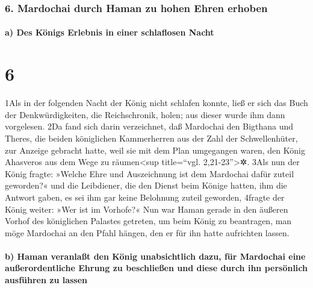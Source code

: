 \hypertarget{mardochai-durch-haman-zu-hohen-ehren-erhoben}{%
\subsubsection{6. Mardochai durch Haman zu hohen Ehren
erhoben}\label{mardochai-durch-haman-zu-hohen-ehren-erhoben}}

\hypertarget{a-des-kuxf6nigs-erlebnis-in-einer-schlaflosen-nacht}{%
\paragraph{a) Des Königs Erlebnis in einer schlaflosen
Nacht}\label{a-des-kuxf6nigs-erlebnis-in-einer-schlaflosen-nacht}}

\hypertarget{section-5}{%
\section{6}\label{section-5}}

1Als in der folgenden Nacht der König nicht schlafen konnte, ließ er
sich das Buch der Denkwürdigkeiten, die Reichschronik, holen; aus dieser
wurde ihm dann vorgelesen. 2Da fand sich darin verzeichnet, daß
Mardochai den Bigthana und Theres, die beiden königlichen Kammerherren
aus der Zahl der Schwellenhüter, zur Anzeige gebracht hatte, weil sie
mit dem Plan umgegangen waren, den König Ahasveros aus dem Wege zu
räumen\textless sup title=``vgl. 2,21-23''\textgreater✲. 3Als nun der
König fragte: »Welche Ehre und Auszeichnung ist dem Mardochai dafür
zuteil geworden?« und die Leibdiener, die den Dienst beim Könige hatten,
ihm die Antwort gaben, es sei ihm gar keine Belohnung zuteil geworden,
4fragte der König weiter: »Wer ist im Vorhofe?« Nun war Haman gerade in
den äußeren Vorhof des königlichen Palastes getreten, um beim König zu
beantragen, man möge Mardochai an den Pfahl hängen, den er für ihn hatte
aufrichten lassen.

\hypertarget{b-haman-veranlauxdft-den-kuxf6nig-unabsichtlich-dazu-fuxfcr-mardochai-eine-auuxdferordentliche-ehrung-zu-beschlieuxdfen-und-diese-durch-ihn-persuxf6nlich-ausfuxfchren-zu-lassen}{%
\paragraph{b) Haman veranlaßt den König unabsichtlich dazu, für
Mardochai eine außerordentliche Ehrung zu beschließen und diese durch
ihn persönlich ausführen zu
lassen}\label{b-haman-veranlauxdft-den-kuxf6nig-unabsichtlich-dazu-fuxfcr-mardochai-eine-auuxdferordentliche-ehrung-zu-beschlieuxdfen-und-diese-durch-ihn-persuxf6nlich-ausfuxfchren-zu-lassen}}

